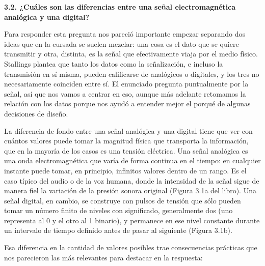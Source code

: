 \documentclass[11pt,a4paper]{article}
\begin{document}
\vspace{0.3cm}
\noindent\textbf{3.2. ¿Cuáles son las diferencias entre una señal electromagnética analógica y una digital?}\par

Para responder esta pregunta nos pareció importante empezar separando dos ideas que en la cursada se suelen mezclar: una cosa es el dato que se quiere transmitir y otra, distinta, es la señal que efectivamente viaja por el medio físico. Stallings plantea que tanto los datos como la señalización, e incluso la transmisión en sí misma, pueden calificarse de analógicos o digitales, y los tres no necesariamente coinciden entre sí. El enunciado pregunta puntualmente por la señal, así que nos vamos a centrar en eso, aunque más adelante retomamos la relación con los datos porque nos ayudó a entender mejor el porqué de algunas decisiones de diseño.

La diferencia de fondo entre una señal analógica y una digital tiene que ver con cuántos valores puede tomar la magnitud física que transporta la información, que en la mayoría de los casos es una tensión eléctrica. Una señal analógica es una onda electromagnética que varía de forma continua en el tiempo: en cualquier instante puede tomar, en principio, infinitos valores dentro de un rango. Es el caso típico del audio o de la voz humana, donde la intensidad de la señal sigue de manera fiel la variación de la presión sonora original (Figura 3.1a del libro). Una señal digital, en cambio, se construye con pulsos de tensión que sólo pueden tomar un número finito de niveles con significado, generalmente dos (uno representa al 0 y el otro al 1 binario), y permanece en ese nivel constante durante un intervalo de tiempo definido antes de pasar al siguiente (Figura 3.1b).

Esa diferencia en la cantidad de valores posibles trae consecuencias prácticas que nos parecieron las más relevantes para destacar en la respuesta:
\end{document}
